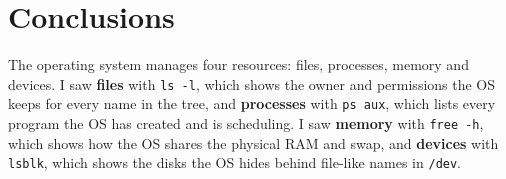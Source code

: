 \documentclass[12pt,a4paper]{article}
\begin{document}
\newpage
\section*{Conclusions}

The operating system manages four resources: files, processes, memory and devices. I saw \textbf{files} with \texttt{ls -l}, which shows the owner and permissions the OS keeps for every name in the tree, and \textbf{processes} with \texttt{ps aux}, which lists every program the OS has created and is scheduling. I saw \textbf{memory} with \texttt{free -h}, which shows how the OS shares the physical RAM and swap, and \textbf{devices} with \texttt{lsblk}, which shows the disks the OS hides behind file-like names in \texttt{/dev}.
\end{document}
